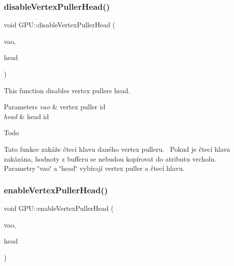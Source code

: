 \subsubsection{\texorpdfstring{disable\+Vertex\+Puller\+Head()}{disableVertexPullerHead()}}
{\footnotesize\ttfamily void G\+P\+U\+::disable\+Vertex\+Puller\+Head (\begin{DoxyParamCaption}\item[{\hyperlink{fwd_8hpp_af6f78f73099477c9ce5537d657597486}{Vertex\+Puller\+ID}}]{vao,  }\item[{uint32\+\_\+t}]{head }\end{DoxyParamCaption})}



This function disables vertex puller\textquotesingle{}s head. 


\begin{DoxyParams}{Parameters}
{\em vao} & vertex puller id \\
\hline
{\em head} & head id \\
\hline
\end{DoxyParams}
\begin{DoxyRefDesc}{Todo}
\item[\hyperlink{todo__todo000013}{Todo}]Tato funkce zakáže čtecí hlavu daného vertex pulleru.~\newline
 Pokud je čtecí hlava zakázána, hodnoty z bufferu se nebudou kopírovat do atributu vrcholu.~\newline
 Parametry \char`\"{}vao\char`\"{} a \char`\"{}head\char`\"{} vybírají vertex puller a čtecí hlavu.~\newline
 \end{DoxyRefDesc}
\mbox{\label{group__vertexpuller__tasks_ga61384d99754bda4d91790c49b1639b30}} 
\subsubsection{\texorpdfstring{enable\+Vertex\+Puller\+Head()}{enableVertexPullerHead()}}
{\footnotesize\ttfamily void G\+P\+U\+::enable\+Vertex\+Puller\+Head (\begin{DoxyParamCaption}\item[{\hyperlink{fwd_8hpp_af6f78f73099477c9ce5537d657597486}{Vertex\+Puller\+ID}}]{vao,  }\item[{uint32\+\_\+t}]{head }\end{DoxyParamCaption})}



